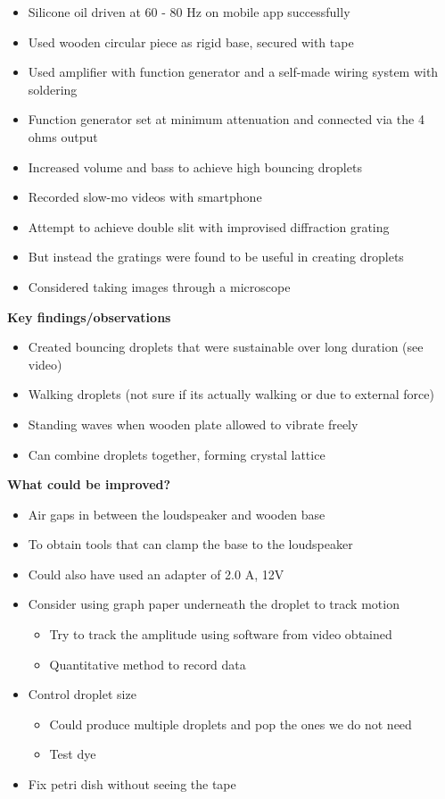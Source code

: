 \begin{itemize}
\item Silicone oil driven at 60 - 80 Hz on mobile app successfully
\item Used wooden circular piece as rigid base, secured with tape
\item Used amplifier with function generator and a self-made wiring system with soldering
\item Function generator set at minimum attenuation and connected via the 4 ohms output
\item Increased volume and bass to achieve high bouncing droplets
\item Recorded slow-mo videos with smartphone
\item Attempt to achieve double slit with improvised diffraction grating
\item But instead the gratings were found to be useful in creating droplets
\item Considered taking images through a microscope
\end{itemize}

\bigskip

\textbf{Key findings/observations}

\begin{itemize}
\item Created bouncing droplets that were sustainable over long duration (see video)
\item Walking droplets (not sure if its actually walking or due to external force)
\item Standing waves when wooden plate allowed to vibrate freely
\item Can combine droplets together, forming crystal lattice
\end{itemize}
\bigskip

\textbf{What could be improved?}

\begin{itemize}
\item Air gaps in between the loudspeaker and wooden base
\item To obtain tools that can clamp the base to the loudspeaker
\item Could also have used an adapter of  2.0 A, 12V
\item Consider using graph paper underneath the droplet to track motion

\begin{itemize}
\item Try to track the amplitude using software from video obtained
\item Quantitative method to record data
\end{itemize}
\item Control droplet size

\begin{itemize}
\item Could produce multiple droplets and pop the ones we do not need
\item Test dye
\end{itemize}
\item Fix petri dish without seeing the tape
\end{itemize}

